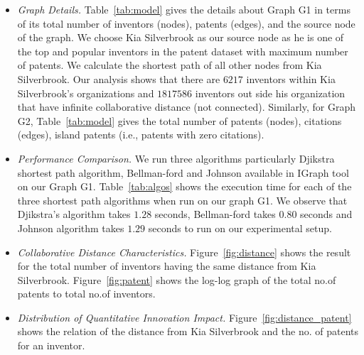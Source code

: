 	\begin{itemize}
	\item {\em Graph Details.}
	Table~\ref{tab:model} gives the details
	about Graph G1 in terms of its total number of inventors (nodes), patents (edges), and the
	source node of the graph. We choose Kia Silverbrook as our source node as he is one
	of the top and popular inventors in the patent dataset with maximum number of
	patents. We calculate the shortest path of all other nodes from Kia Silverbrook.
	Our analysis shows that there are $6217$ inventors within Kia Silverbrook's organizations 
	and $1817586$ inventors out side his organization that have infinite collaborative distance (not connected).
	Similarly, for Graph G2, Table~\ref{tab:model} gives the total number of patents (nodes), citations (edges), island patents (i.e., patents with zero citations).

	\item {\em Performance Comparison.}
	We run three algorithms particularly Djikstra shortest path algorithm,
	Bellman-ford and Johnson available in IGraph tool on our Graph G1.
	Table~\ref{tab:algos} shows the execution time for each of the three shortest
	path algorithms  when run on our graph G1. We observe that Djikstra's
	algorithm takes $1.28$ seconds, Bellman-ford takes $0.80$ seconds and Johnson
	algorithm takes $1.29$ seconds to run on our experimental setup.
	
	\item {\em Collaborative Distance Characteristics.}
	Figure~\ref{fig:distance} shows the result for the total number of inventors
	having the same distance from Kia Silverbrook. Figure~\ref{fig:patent} shows the log-log graph of the total no.of patents to total no.of inventors. 

	\item{\em Distribution of Quantitative Innovation Impact.}
	Figure~\ref{fig:distance_patent} shows the relation of the distance from
	Kia Silverbrook and the no. of patents for an inventor. 
	\end{itemize}
